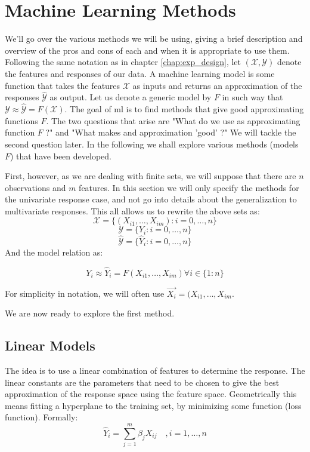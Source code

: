 \section{Machine Learning Methods}
We'll go over the various methods we will be using, giving a brief description and overview of the pros and cons of each and when it is appropriate to use them.
Following the same notation as in chapter \ref{chap:exp_design}, let $(\mathcal{X},\mathcal{Y})$ denote the features and responses of our data. A machine learning model is some function that takes the features $\mathcal{X}$ as inputs and returns an approximation of the responses $\hat{\mathcal{Y}}$ as output. Let us denote a generic model by $F$ in such way that $\mathcal{Y} \approx \hat{\mathcal{Y}}=F(\mathcal{X})$.
The goal of \acrshort{ml} is to find methods that give good approximating functions $F$. The two questions that arise are "What do we use as approximating function $F$ ?" and "What makes and approximation 'good' ?" We will tackle the second question later. In the following we shall explore various methods (models $F$) that have been developed.

First, however, as we are dealing with finite sets, we will suppose that there are $n$ observations and $m$ features. In this section we will only specify the methods for the univariate response case, and not go into details about the generalization to multivariate responses. This all allows us to rewrite the above sets as:
$$\mathcal{X}=\{(X_{i1},\dots,X_{im}) : i=0,\dots,n\}$$
$$\mathcal{Y}=\{Y_i : i=0,\dots,n\}$$
$$\hat{\mathcal{Y}}=\{\hat{Y}_i : i=0,\dots,n\}$$
And the model relation as:

$$
Y_i \approx \hat{Y}_i = F(X_{i1},\dots,X_{im}) \forall i \in \{1:n\}
$$

For simplicity in notation, we will often use $ \vec{X_i}=(X_{i1},\dots,X_{im} $.

We are now ready to explore the first method.

\subsection{Linear Models}
The idea is to use a linear combination of features to determine the response. The linear constants are the parameters that need to be chosen to give the best approximation of the response space using the feature space. Geometrically this means fitting a hyperplane to the training set, by minimizing some function (loss function).
Formally:
$$
\hat{Y}_i = \sum_{j=1}^m \beta_{j} X_{ij} \quad, i=1,\dots,n
$$

